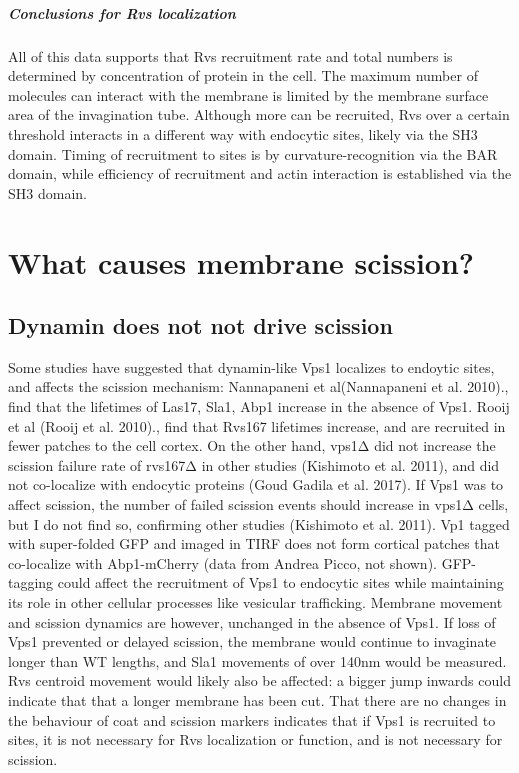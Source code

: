 \subparagraph{Conclusions for Rvs localization }
All of this data supports that Rvs recruitment rate and total numbers is determined by concentration of protein in the cell. The maximum number of molecules can interact with the membrane is limited by the membrane surface area of the invagination tube. Although more can be recruited, Rvs over a certain threshold interacts in a different way with endocytic sites, likely via the SH3 domain. Timing of recruitment to sites is by curvature-recognition via the BAR domain, while efficiency of recruitment and actin interaction is established via the SH3 domain. 


\section{What causes membrane scission?}


\subsection{Dynamin does not not drive scission}
Some studies have suggested that dynamin-like Vps1 localizes to endoytic sites, and affects the scission mechanism: Nannapaneni et al(Nannapaneni et al. 2010)., find that the lifetimes of Las17, Sla1, Abp1 increase in the absence of Vps1. Rooij et al (Rooij et al. 2010)., find that Rvs167 lifetimes increase, and are recruited in fewer patches to the cell cortex. On the other hand, vps1Δ did not increase the scission failure rate of rvs167Δ in other studies (Kishimoto et al. 2011), and did not co-localize with endocytic proteins (Goud Gadila et al. 2017). If Vps1 was to affect scission, the number of failed scission events should increase in vps1Δ cells, but I do not find so, confirming other studies (Kishimoto et al. 2011). Vp1 tagged with super-folded GFP and imaged in TIRF does not form cortical patches that co-localize with Abp1-mCherry (data from Andrea Picco, not shown). GFP-tagging could affect the recruitment of Vps1 to endocytic sites while maintaining its role in other cellular processes like vesicular trafficking. Membrane movement and scission dynamics are however, unchanged in the absence of Vps1. If loss of Vps1 prevented or delayed scission, the membrane would continue to invaginate longer than WT lengths, and Sla1 movements of over 140nm would be measured. Rvs centroid movement would likely also be affected: a bigger jump inwards could indicate that that a longer membrane has been cut. That there are no changes in the behaviour of coat and scission markers indicates that if Vps1 is recruited to sites, it is not necessary for Rvs localization or function, and is not necessary for scission. 


